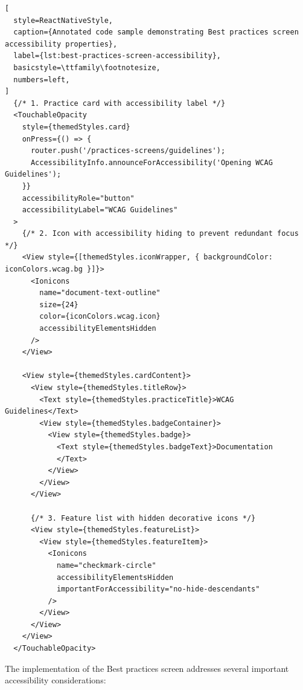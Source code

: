 \begin{lstlisting}[
  style=ReactNativeStyle,
  caption={Annotated code sample demonstrating Best practices screen accessibility properties},
  label={lst:best-practices-screen-accessibility},
  basicstyle=\ttfamily\footnotesize,
  numbers=left,
]
  {/* 1. Practice card with accessibility label */}
  <TouchableOpacity
    style={themedStyles.card}
    onPress={() => {
      router.push('/practices-screens/guidelines');
      AccessibilityInfo.announceForAccessibility('Opening WCAG Guidelines');
    }}
    accessibilityRole="button"
    accessibilityLabel="WCAG Guidelines"
  >
    {/* 2. Icon with accessibility hiding to prevent redundant focus */}
    <View style={[themedStyles.iconWrapper, { backgroundColor: iconColors.wcag.bg }]}>
      <Ionicons
        name="document-text-outline"
        size={24}
        color={iconColors.wcag.icon}
        accessibilityElementsHidden
      />
    </View>

    <View style={themedStyles.cardContent}>
      <View style={themedStyles.titleRow}>
        <Text style={themedStyles.practiceTitle}>WCAG Guidelines</Text>
        <View style={themedStyles.badgeContainer}>
          <View style={themedStyles.badge}>
            <Text style={themedStyles.badgeText}>Documentation
            </Text>
          </View>
        </View>
      </View>

      {/* 3. Feature list with hidden decorative icons */}
      <View style={themedStyles.featureList}>
        <View style={themedStyles.featureItem}>
          <Ionicons
            name="checkmark-circle"
            accessibilityElementsHidden
            importantForAccessibility="no-hide-descendants"
          />
        </View>
      </View>
    </View>
  </TouchableOpacity>
\end{lstlisting}
\FloatBarrier

The implementation of the Best practices screen addresses several important accessibility considerations:


